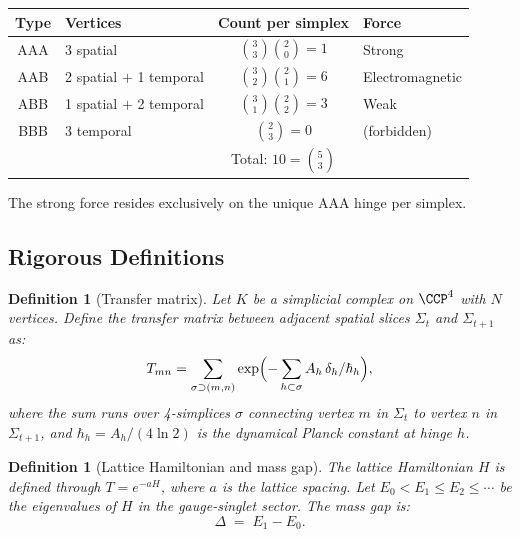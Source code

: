 \documentclass[12pt]{article}
\newtheorem{definition}[theorem]{Definition}
\theoremstyle{remark}
\theoremstyle{definition}
\begin{document}
\begin{center}
\begin{tabular}{clcl}
\hline
Type & Vertices & Count per simplex & Force \\
\hline
AAA & 3 spatial & $\binom{3}{3}\binom{2}{0} = 1$ & Strong \\
AAB & 2 spatial $+$ 1 temporal & $\binom{3}{2}\binom{2}{1} = 6$ &
  Electromagnetic \\
ABB & 1 spatial $+$ 2 temporal & $\binom{3}{1}\binom{2}{2} = 3$ &
  Weak \\
BBB & 3 temporal & $\binom{2}{3} = 0$ & (forbidden) \\
\hline
& & Total: $10 = \binom{5}{3}$ & \\
\hline
\end{tabular}
\end{center}

\noindent
The strong force resides exclusively on the unique AAA hinge per simplex.

\subsection{Rigorous Definitions}
\label{sec:definitions}

\begin{definition}[Transfer matrix]
\label{def:transfer}
Let $K$ be a simplicial complex on $\CCP^4$ with $N$ vertices.
Define the \emph{transfer matrix} between adjacent spatial slices
$\Sigma_t$ and $\Sigma_{t+1}$ as:
\begin{equation}
T_{mn} = \sum_{\sigma \supset (m,n)}
  \exp\Bigl(-\sum_{h \subset \sigma} A_h\,\delta_h / \hbar_h\Bigr),
\end{equation}
where the sum runs over 4-simplices $\sigma$ connecting vertex $m$
in $\Sigma_t$ to vertex $n$ in $\Sigma_{t+1}$, and
$\hbar_h = A_h/(4\ln 2)$ is the dynamical Planck constant at hinge $h$.
\end{definition}

\begin{definition}[Lattice Hamiltonian and mass gap]
\label{def:massgap}
The lattice Hamiltonian $H$ is defined through $T = e^{-aH}$, where
$a$ is the lattice spacing.  Let $E_0 < E_1 \leq E_2 \leq \cdots$ be
the eigenvalues of $H$ in the gauge-singlet sector.  The
\emph{mass gap} is:
\begin{equation}
\Delta \;=\; E_1 - E_0.
\end{equation}
\end{definition}
\end{document}
